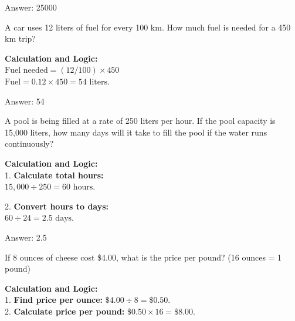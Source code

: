 \documentclass[11pt,paper=a4,answers]{exam}
\begin{document}
\begin{questions}
\begin{solution}
\vspace{30pt}

Answer: \colorbox{yellow!100}{25000}
\end{solution}

\vspace{60pt}

\question
A car uses 12 liters of fuel for every 100 km. How much fuel is needed for a 450 km trip?

\begin{solution}
\textbf{Calculation and Logic:} \\
$\text{Fuel needed} = (12/100) \times 450$ \\
$\text{Fuel} = 0.12 \times 450 = 54 \text{ liters}$.

\vspace{30pt}

Answer: \colorbox{yellow!100}{54}
\end{solution}

\vspace{60pt}

\question
A pool is being filled at a rate of 250 liters per hour. If the pool capacity is 15,000 liters, how many days will it take to fill the pool if the water runs continuously?

\begin{solution}
\textbf{Calculation and Logic:} \\
1. \textbf{Calculate total hours:} \\
$15,000 \div 250 = 60 \text{ hours}$.

\vspace{15pt}

2. \textbf{Convert hours to days:} \\
$60 \div 24 = 2.5 \text{ days}$.

\vspace{30pt}

Answer: \colorbox{yellow!100}{2.5}
\end{solution}

\vspace{60pt}

\question
If 8 ounces of cheese cost \$4.00, what is the price per pound? (16 ounces = 1 pound)

\begin{solution}
\textbf{Calculation and Logic:} \\
1. \textbf{Find price per ounce:} $\$4.00 \div 8 = \$0.50$. \\
2. \textbf{Calculate price per pound:} $\$0.50 \times 16 = \$8.00$.


\end{solution}
\end{questions}
\end{document}
